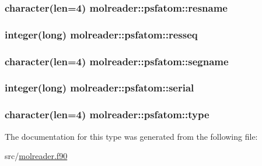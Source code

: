\hypertarget{structmolreader_1_1psfatom_a0bd7d6afb5d4c41d84a1e278d341ec00}{
\subsubsection[{resname}]{\setlength{\rightskip}{0pt plus 5cm}character(len=4) molreader\-::psfatom\-::resname\hspace{0.3cm}{\ttfamily [private]}}}\label{structmolreader_1_1psfatom_a0bd7d6afb5d4c41d84a1e278d341ec00}
\hypertarget{structmolreader_1_1psfatom_abb34c7f3cc664d0e63be1fc695413f7a}{
\subsubsection[{resseq}]{\setlength{\rightskip}{0pt plus 5cm}integer(long) molreader\-::psfatom\-::resseq\hspace{0.3cm}{\ttfamily [private]}}}\label{structmolreader_1_1psfatom_abb34c7f3cc664d0e63be1fc695413f7a}
\hypertarget{structmolreader_1_1psfatom_aed960b86c5ddd5378e5a849a2732f650}{
\subsubsection[{segname}]{\setlength{\rightskip}{0pt plus 5cm}character(len=4) molreader\-::psfatom\-::segname\hspace{0.3cm}{\ttfamily [private]}}}\label{structmolreader_1_1psfatom_aed960b86c5ddd5378e5a849a2732f650}
\hypertarget{structmolreader_1_1psfatom_ab524e29eb9ad1beb802719121a639fa0}{
\subsubsection[{serial}]{\setlength{\rightskip}{0pt plus 5cm}integer(long) molreader\-::psfatom\-::serial\hspace{0.3cm}{\ttfamily [private]}}}\label{structmolreader_1_1psfatom_ab524e29eb9ad1beb802719121a639fa0}
\hypertarget{structmolreader_1_1psfatom_a99d2104c1a01026eef2cd329fd546f90}{
\subsubsection[{type}]{\setlength{\rightskip}{0pt plus 5cm}character(len=4) molreader\-::psfatom\-::type\hspace{0.3cm}{\ttfamily [private]}}}\label{structmolreader_1_1psfatom_a99d2104c1a01026eef2cd329fd546f90}


The documentation for this type was generated from the following file\-:\begin{DoxyCompactItemize}
\item 
src/\hyperlink{molreader_8f90}{molreader.\-f90}\end{DoxyCompactItemize}

